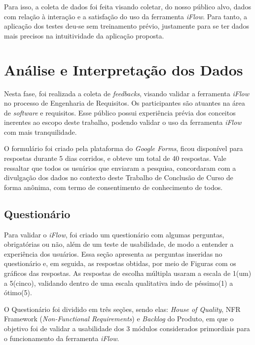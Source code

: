 Para isso, a coleta de dados foi feita visando coletar, do nosso público alvo, dados com relação à interação e a satisfação do uso da ferramenta \textit{iFlow}. Para tanto, a aplicação dos testes deu-se sem treinamento prévio, justamente para se ter dados mais precisos na intuitividade da aplicação proposta. 

\section{Análise e Interpretação dos Dados}
\label{sec:ana_int_dados}
Nesta fase, foi realizada a coleta de \textit{feedbacks}, visando validar a ferramenta \textit{iFlow} no processo de Engenharia de Requisitos. Os participantes são atuantes na área de \textit{software} e requisitos. Esse público possui experiência prévia dos conceitos inerentes ao escopo deste trabalho, podendo validar o uso da ferramenta \textit{iFlow} com mais tranquilidade.

O formulário foi criado pela plataforma do \textit{Google Forms}, ficou disponível para respostas durante 5 dias corridos, e obteve um total de 40 respostas. Vale ressaltar que todos os usuários que enviaram a pesquisa, concordaram com a divulgação dos dados no contexto deste Trabalho de Conclusão de Curso de forma anônima, com termo de consentimento de conhecimento de todos.

\subsection{Questionário}
Para validar o \textit{iFlow}, foi criado um questionário com algumas perguntas, obrigatórias ou não, além de um teste de usabilidade, de modo a entender a experiência dos usuários. Essa seção apresenta as perguntas inseridas no questionário e, em seguida, as respostas obtidas, por meio de Figuras com os gráficos das respostas. As respostas de escolha múltipla usaram a escala de 1(um) a 5(cinco), validando dentro de uma escala qualitativa indo de péssimo(1) a ótimo(5). 

O Questionário foi dividido em três seções, sendo elas: \textit{House of Quality}, NFR Framework (\textit{Non-Functional Requirements}) e \textit{Backlog} do Produto, em que o objetivo foi de validar a usabilidade dos 3 módulos considerados primordiais para o funcionamento da ferramenta \textit{iFlow}.


